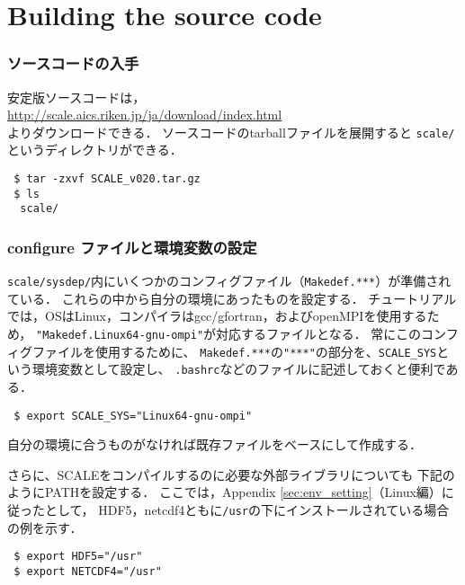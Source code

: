 \section{Building the source code} \label{sec:source_code}


\subsubsection{ソースコードの入手}
安定版ソースコードは，\\
 \url{http://scale.aics.riken.jp/ja/download/index.html}\\
よりダウンロードできる．
ソースコードのtarballファイルを展開すると
\verb|scale/|というディレクトリができる．
\begin{verbatim}
 $ tar -zxvf SCALE_v020.tar.gz
 $ ls
  scale/
\end{verbatim}



\subsubsection{configure ファイルと環境変数の設定}

\verb|scale/sysdep/|内にいくつかのコンフィグファイル（\verb|Makedef.***|）が準備されている．
これらの中から自分の環境にあったものを設定する．
チュートリアルでは，OSはLinux，コンパイラはgcc/gfortran，およびopenMPIを使用するため，
\verb|"Makedef.Linux64-gnu-ompi"|が対応するファイルとなる．
常にこのコンフィグファイルを使用するために、
\verb|Makedef.***|の\verb|"***"|の部分を、\verb|SCALE_SYS|という環境変数として設定し、
\verb|.bashrc|などのファイルに記述しておくと便利である．
\begin{verbatim}
 $ export SCALE_SYS="Linux64-gnu-ompi"
\end{verbatim}
自分の環境に合うものがなければ既存ファイルをベースにして作成する．

さらに、SCALEをコンパイルするのに必要な外部ライブラリについても
下記のようにPATHを設定する．
ここでは，Appendix \ref{sec:env_setting}（Linux編）に従ったとして，
HDF5，netcdf4ともに\verb|/usr|の下にインストールされている場合の例を示す．
\begin{verbatim}
 $ export HDF5="/usr"
 $ export NETCDF4="/usr"
\end{verbatim}


